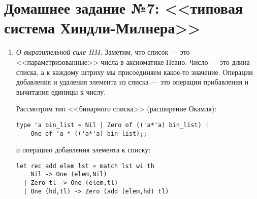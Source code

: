 

\cfoot{}



\section*{Домашнее задание №7: <<типовая система Хиндли-Милнера>>}
\begin{enumerate}
    \item \emph{О выразительной силе HM.} Заметим, что список --- это <<параметризованные>> числа в
          аксиоматике Пеано. Число --- это длина списка, а к каждому штриху мы присоединяем какое-то значение.
          Операции добавления и удаления элемента из списка --- это операции прибавления и вычитания
          единицы к числу.

          Рассмотрим тип <<бинарного списка>> (расширение Окамля):

          \begin{verbatim}
type 'a bin_list = Nil | Zero of (('a*'a) bin_list) |
    One of 'a * (('a*'a) bin_list);;
\end{verbatim}

          и операцию добавления элемента к списку:

          \begin{verbatim}
let rec add elem lst = match lst wi th
    Nil -> One (elem,Nil)
  | Zero tl -> One (elem,tl)
  | One (hd,tl) -> Zero (add (elem,hd) tl)
\end{verbatim}


\end{enumerate}
